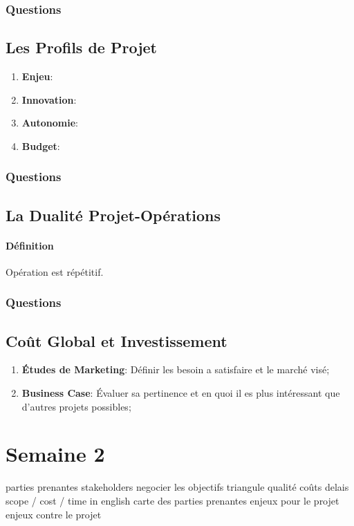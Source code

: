 \documentclass{article}
\begin{document}
\subsubsection{Questions}


\subsection{Les Profils de Projet}
\begin{enumerate}
    \item \textbf{Enjeu}:
    \item \textbf{Innovation}:
    \item \textbf{Autonomie}:
    \item \textbf{Budget}:
\end{enumerate}

\subsubsection{Questions}


\subsection{La Dualité Projet-Opérations}
\paragraph{Définition}Opération est répétitif.

\subsubsection{Questions}


\subsection{Coût Global et Investissement}
\begin{enumerate}[]
    \item \textbf{Études de Marketing}: Définir les besoin a satisfaire et le marché visé;
    \item \textbf{Business Case}: Évaluer sa pertinence et en quoi il es plus intéressant que d'autres projets possibles; 
\end{enumerate}

\section{Semaine 2}
parties prenantes stakeholders
    negocier les objectifs
    triangule qualité coûts delais
        scope / cost / time in english
    carte des parties prenantes
        enjeux pour le projet
        enjeux contre le projet
\end{document}
